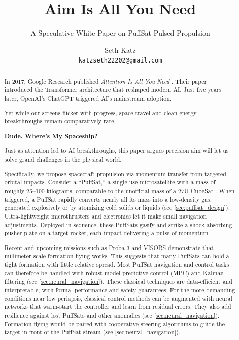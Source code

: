 \documentclass{article}
\title{Aim Is All You Need}
\subtitle{A Speculative White Paper on PuffSat Pulsed Propulsion}
\author{
  Seth Katz \\
  \texttt{katzseth22202@gmail.com} \\
}
\begin{document}
\maketitle

\newpage
\tableofcontents
\newpage

\begin{abstract}\label{sec:abstract}
 
In 2017, Google Research published \textit{Attention Is All You Need} \cite{vaswani2017attentionneed}.  Their paper introduced the Transformer architecture that reshaped modern AI.   Just five years later, OpenAI's ChatGPT \cite{chatgpt} triggered AI's mainstream adoption.

Yet while our screens flicker with progress, space travel and clean energy breakthroughs remain comparatively rare.

\textbf{Dude, Where's My Spaceship?}

Just as attention led to AI breakthroughs, this paper argues precision aim will let us solve grand challenges in the physical world.

Specifically, we propose spacecraft propulsion via momentum transfer from targeted orbital impacts.  Consider a ``PuffSat,'' a single-use microsatellite with a mass of roughly 25–100 kilograms, comparable to the unofficial mass of a 27U CubeSat \cite{cubesat_advanced_standard}.  When triggered, a PuffSat rapidly converts nearly all its mass into a low-density gas, generated explosively or by atomizing cold solids or liquids (see \autoref{sec:puffsat_design}). Ultra-lightweight microthrusters and electronics let it make small navigation adjustments.  Deployed in sequence, these PuffSats gasify and strike a shock-absorbing pusher plate on a target rocket, each impact delivering a pulse of momentum.

Recent and upcoming missions such as Proba-3 \cite{llorente2013proba3,zhukov2025proba3aspiics} and VISORS \cite{visors_formation_flying} demonstrate that millimeter-scale formation flying works. This suggests that many PuffSats can hold a tight formation with little relative spread. Most PuffSat navigation and control tasks can therefore be handled with robust model predictive control (MPC) \cite{visors_formation_flying} and Kalman filtering (see \autoref{sec:neural_navigation}).  These classical techniques are data-efficient and interpretable, with formal performance and safety guarantees. For the more demanding conditions near low periapsis, classical control methods can be augmented with neural networks that warm-start the controller and learn from residual errors.  They also add resilience against lost PuffSats and other anomalies (see \autoref{sec:neural_navigation}).  Formation flying would be paired with cooperative steering algorithms to guide the target in front of the PuffSat stream (see \autoref{sec:neural_navigation}).


\end{abstract}
\end{document}
